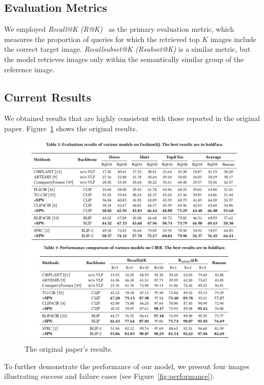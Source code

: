 \subsection{Evaluation Metrics}
We employed \textit{Recall@K (R@K)}~\cite{patel2022recallksurrogatelosslarge} as the primary evaluation metric, which measures the proportion of queries for which the retrieved top \(K\) images include the correct target image. \textit{Recallsubset@K (Rsubset@K)} is a similar metric, but the model retrieves images only within the semantically similar group of the reference image.

\subsection{Current Results}
We obtained results that are highly consistent with those reported in the original paper. Figure~\ref{fig:result} shows the original results.

\begin{figure}[t]
    \centering
    \includegraphics[width=\textwidth]{figures/result.png}
    \caption{The original paper's results.}
    \label{fig:result}
\end{figure}

To further demonstrate the performance of our model, we present four images illustrating success and failure cases (see Figure~\ref{fig:performance}).

